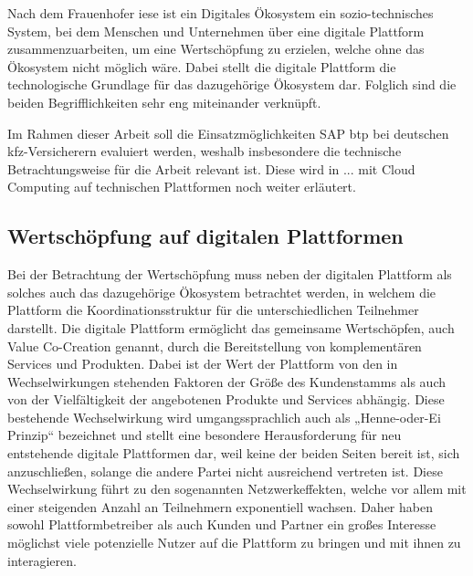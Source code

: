 Nach dem Frauenhofer \ac{iese} ist ein Digitales Ökosystem ein sozio-technisches System, bei dem Menschen und Unternehmen über eine digitale Plattform zusammenzuarbeiten, um eine Wertschöpfung zu erzielen, welche ohne das Ökosystem nicht möglich wäre. \autocite[Vgl.][S. 376]{MULLERSTEWENS2019} Dabei stellt die digitale Plattform die technologische Grundlage für das dazugehörige Ökosystem dar. \autocite[Vgl.][S. 376]{IESE2021} Folglich sind die beiden Begrifflichkeiten sehr eng miteinander verknüpft.

Im Rahmen dieser Arbeit soll die Einsatzmöglichkeiten SAP \ac{btp} bei deutschen \ac{kfz}-Versicherern evaluiert werden, weshalb insbesondere die technische Betrachtungsweise für die Arbeit relevant ist. Diese wird in ... mit Cloud Computing auf technischen Plattformen noch weiter erläutert.


\subsection{Wertschöpfung auf digitalen Plattformen}

Bei der Betrachtung der Wertschöpfung muss neben der digitalen Plattform als solches auch das dazugehörige Ökosystem betrachtet werden, in welchem die Plattform die Koordinationsstruktur für die unterschiedlichen Teilnehmer darstellt. Die digitale Plattform ermöglicht das gemeinsame Wertschöpfen, auch Value Co-Creation genannt, durch die Bereitstellung von komplementären Services und Produkten. Dabei ist der Wert der Plattform von den in Wechselwirkungen stehenden Faktoren der Größe des Kundenstamms als auch von der Vielfältigkeit der angebotenen Produkte und Services abhängig. Diese bestehende Wechselwirkung wird umgangssprachlich auch als „Henne-oder-Ei Prinzip“ bezeichnet und stellt eine besondere Herausforderung für neu entstehende digitale Plattformen dar, weil keine der beiden Seiten bereit ist, sich anzuschließen, solange die andere Partei nicht ausreichend vertreten ist. \autocite[Vgl.][S. 310]{CAILLAUD2003} Diese Wechselwirkung führt zu den sogenannten Netzwerkeffekten, welche vor allem mit einer steigenden Anzahl an Teilnehmern exponentiell wachsen. Daher haben sowohl Plattformbetreiber als auch Kunden und Partner ein großes Interesse möglichst viele potenzielle Nutzer auf die Plattform zu bringen und mit ihnen zu interagieren. \autocite[Vgl.][S. 596-600]{HAHN2016} 

